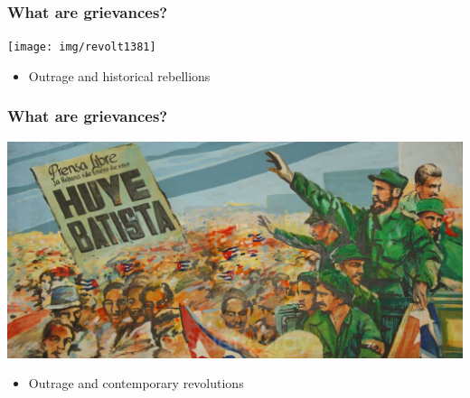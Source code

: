 \documentclass[utf8, xcolor=dvipsnames]{beamer}
\begin{document}
\begin{frame}
\frametitle{What are grievances?}
\centering

\texttt{[image: img/revolt1381]}

\begin{itemize}
  \item Outrage and historical rebellions
\end{itemize}

\end{frame}

\begin{frame}
\frametitle{What are grievances?}
\centering

\includegraphics[width = \textwidth]{img/cuba}

\begin{itemize}
  \item Outrage and contemporary revolutions
\end{itemize}

\end{frame}
\end{document}
